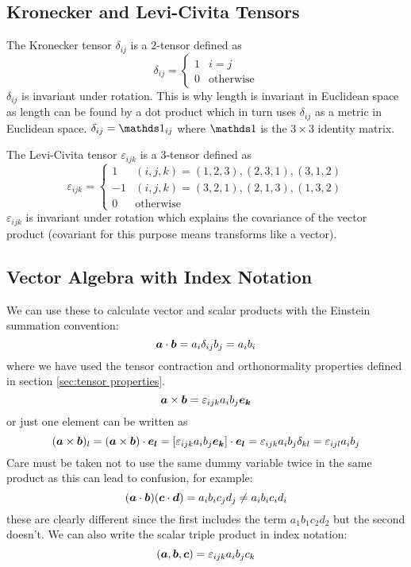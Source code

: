 \documentclass{article}
\begin{document}
    \subsection{Kronecker and Levi-Civita Tensors}
    The Kronecker tensor \(\delta_{ij}\) is a 2-tensor defined as
    \[
        \delta_{ij} = 
        \begin{cases}
            1 & i = j\\
            0 & \text{otherwise}
        \end{cases}
    \]
    \(\delta_{ij}\) is invariant under rotation.
    This is why length is invariant in Euclidean space as length can be found by a dot product which in turn uses \(\delta_{ij}\) as a metric in Euclidean space.
    \(\delta_{ij} = \ident_{ij}\) where \(\ident\) is the \(3\times 3\) identity matrix.
    
    The Levi-Civita tensor \(\varepsilon_{ijk}\) is a 3-tensor defined as
    \[
        \varepsilon_{ijk} = 
        \begin{cases}
            1 & (i, j, k) = (1, 2, 3), (2, 3, 1), (3, 1, 2)\\
            -1 & (i, j, k) = (3, 2, 1), (2, 1, 3), (1, 3, 2)\\
            0 & \text{otherwise}
        \end{cases}
    \]
    \(\varepsilon_{ijk}\) is invariant under rotation which explains the covariance of the vector product (covariant for this purpose means transforms like a vector).
    
    \subsection{Vector Algebra with Index Notation}
    We can use these to calculate vector and scalar products with the Einstein summation convention:
    \[\bm{a}\cdot\bm{b} = a_i\delta_{ij}b_j = a_ib_i\]
    where we have used the tensor contraction and orthonormality properties defined in section \ref{sec:tensor properties}.
    \[\bm{a}\times\bm{b} = \varepsilon_{ijk}a_ib_j\bm{e_{k}}\]
    or just one element can be written as
    \[(\bm{a}\times\bm{b})_l = (\bm{a}\times \bm{b})\cdot\bm{e_{l}} = [\varepsilon_{ijk}a_ib_j\bm{e_{k}}]\cdot\bm{e_{l}} = \varepsilon_{ijk} a_ib_j\delta_{kl} = \varepsilon_{ijl}a_ib_j\]
    Care must be taken not to use the same dummy variable twice in the same product as this can lead to confusion, for example:
    \[(\bm{a}\cdot\bm{b})(\bm{c}\cdot\bm{d}) = a_ib_ic_jd_j \ne a_ib_ic_id_i\]
    these are clearly different since the first includes the term \(a_1b_1c_2d_2\) but the second doesn't.
    We can also write the scalar triple product in index notation:
    \[(\bm{a}, \bm{b}, \bm{c}) = \varepsilon_{ijk}a_ib_jc_k\]
    
\end{document}
